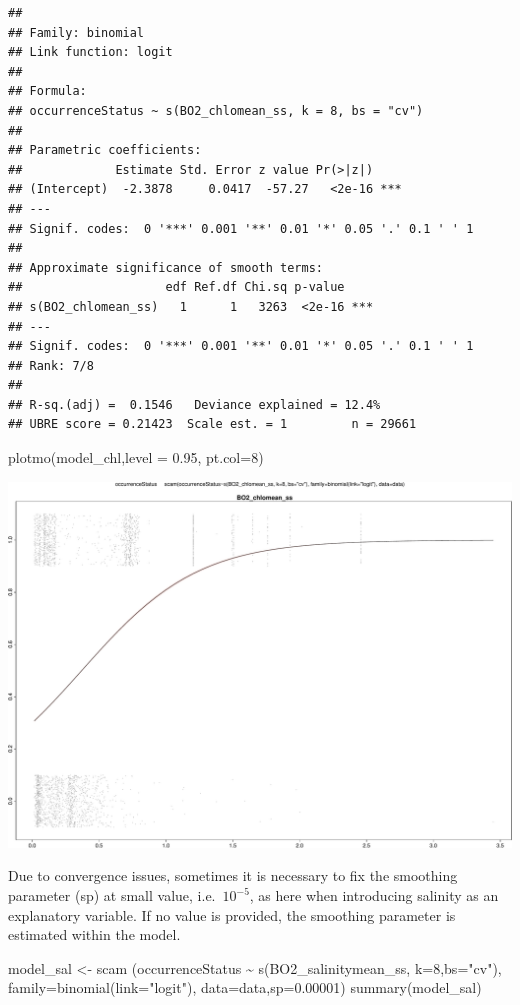 \documentclass[
]{book}
\newenvironment{Shaded}{\begin{snugshade}}{\end{snugshade}}
\newcommand{\AttributeTok}[1]{\textcolor[rgb]{0.77,0.63,0.00}{#1}}
\newcommand{\DecValTok}[1]{\textcolor[rgb]{0.00,0.00,0.81}{#1}}
\newcommand{\FloatTok}[1]{\textcolor[rgb]{0.00,0.00,0.81}{#1}}
\newcommand{\FunctionTok}[1]{\textcolor[rgb]{0.00,0.00,0.00}{#1}}
\newcommand{\NormalTok}[1]{#1}
\newcommand{\OtherTok}[1]{\textcolor[rgb]{0.56,0.35,0.01}{#1}}
\newcommand{\SpecialCharTok}[1]{\textcolor[rgb]{0.00,0.00,0.00}{#1}}
\newcommand{\StringTok}[1]{\textcolor[rgb]{0.31,0.60,0.02}{#1}}
\begin{document}
\begin{verbatim}
## 
## Family: binomial 
## Link function: logit 
## 
## Formula:
## occurrenceStatus ~ s(BO2_chlomean_ss, k = 8, bs = "cv")
## 
## Parametric coefficients:
##             Estimate Std. Error z value Pr(>|z|)    
## (Intercept)  -2.3878     0.0417  -57.27   <2e-16 ***
## ---
## Signif. codes:  0 '***' 0.001 '**' 0.01 '*' 0.05 '.' 0.1 ' ' 1
## 
## Approximate significance of smooth terms:
##                    edf Ref.df Chi.sq p-value    
## s(BO2_chlomean_ss)   1      1   3263  <2e-16 ***
## ---
## Signif. codes:  0 '***' 0.001 '**' 0.01 '*' 0.05 '.' 0.1 ' ' 1
## Rank: 7/8
## 
## R-sq.(adj) =  0.1546   Deviance explained = 12.4%
## UBRE score = 0.21423  Scale est. = 1         n = 29661
\end{verbatim}

\begin{Shaded}
\begin{Highlighting}[]
\FunctionTok{plotmo}\NormalTok{(model\_chl,}\AttributeTok{level =} \FloatTok{0.95}\NormalTok{, }\AttributeTok{pt.col=}\DecValTok{8}\NormalTok{)}
\end{Highlighting}
\end{Shaded}

\includegraphics{_main_files/figure-latex/unnamed-chunk-62-1.pdf}

Due to convergence issues, sometimes it is necessary to fix the smoothing parameter (sp) at small value, i.e.~\(10^{-5}\), as here when introducing salinity as an explanatory variable. If no value is provided, the smoothing parameter is estimated within the model.

\begin{Shaded}
\begin{Highlighting}[]
\NormalTok{model\_sal }\OtherTok{\textless{}{-}} \FunctionTok{scam}\NormalTok{ (occurrenceStatus }\SpecialCharTok{\textasciitilde{}}  \FunctionTok{s}\NormalTok{(BO2\_salinitymean\_ss, }\AttributeTok{k=}\DecValTok{8}\NormalTok{,}\AttributeTok{bs=}\StringTok{"cv"}\NormalTok{), }\AttributeTok{family=}\FunctionTok{binomial}\NormalTok{(}\AttributeTok{link=}\StringTok{"logit"}\NormalTok{), }\AttributeTok{data=}\NormalTok{data,}\AttributeTok{sp=}\FloatTok{0.00001}\NormalTok{)}
\FunctionTok{summary}\NormalTok{(model\_sal)}
\end{Highlighting}
\end{Shaded}
\end{document}
